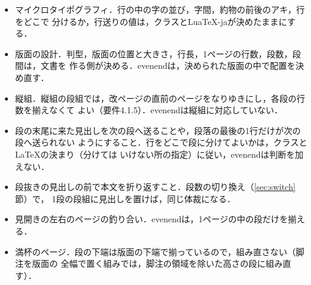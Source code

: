\documentclass[twocolumn,paper=a4,fontsize=10pt]{jlreq}
\providecommand\LuaTeX{Lua\TeX}
\begin{document}
\begin{itemize}
  \item マイクロタイポグラフィ．行の中の字の並び，字間，約物の前後のアキ，行をどこで
    分けるか，行送りの値は，クラスと\LuaTeX-jaが決めたままにする．
  \item 版面の設計．判型，版面の位置と大きさ，行長，1ページの行数，段数，段間は，文書を
    作る側が決める．evenendは，決められた版面の中で配置を決め直す．
  \item 縦組．縦組の段組では，改ページの直前のページをなりゆきにし，各段の行数を揃えなくて
    よい（要件4.1.5）．evenendは縦組に対応していない．
  \item 段の末尾に来た見出しを次の段へ送ることや，段落の最後の1行だけが次の段へ送られない
    ようにすること．行をどこで段に分けてよいかは，クラスと\LaTeX{}の決まり（分けては
    いけない所の指定）に従い，evenendは判断を加えない．
  \item 段抜きの見出しの前で本文を折り返すこと．段数の切り換え（\ref{sec:switch}節）で，
    1段の段組に見出しを置けば，同じ体裁になる．
  \item 見開きの左右のページの釣り合い．evenendは，1ページの中の段だけを揃える．
  \item 満杯のページ．段の下端は版面の下端で揃っているので，組み直さない（脚注を版面の
    全幅で置く組みでは，脚注の領域を除いた高さの段に組み直す）．
\end{itemize}
\end{document}
